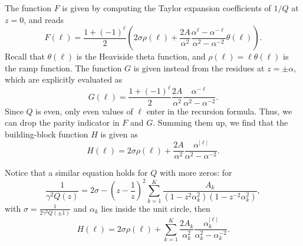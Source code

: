 \documentclass[a4paper,11pt,english]{article}
\theoremstyle{plain}
\theoremstyle{definition}
\theoremstyle{plain}
\begin{document}
The function $F$ is given by computing the Taylor expansion coefficients of $1/Q$ at $z = 0$, and reads
\begin{equation}\label{eq:F:toy} %
	F(\ell)
	=
    \frac{1 + (-1)^\ell}{2}
    \left(
	   2\sigma\rho(\ell)
	   +
	   \frac{2A}{\alpha^2}
	   \frac{\alpha^\ell - \alpha^{-\ell}}{\alpha^2 - \alpha^{-2}}
        \theta(\ell)
	\right)
	.
\end{equation}
Recall that $\theta(\ell)$ is the Heaviside theta function, and $\rho(\ell) = \ell \theta(\ell)$ is the ramp function. The function $G$ is given instead from the residues at $z = \pm \alpha$, which are explicitly evaluated as
\begin{equation}\label{eq:G:toy} %
	G(\ell)
	=
	\frac{1+(-1)^\ell}{2}
	\frac{2A}{\alpha^2}
	\frac{\alpha^{-\ell}}{\alpha^2 - \alpha^{-2}} .
\end{equation}
Since $Q$ is even, only even values of $\ell$ enter in the recursion formula. Thus, we can drop the parity indicator in $F$ and $G$. Summing them up, we find that the building-block function $H$ is given as
\begin{equation}
	H(\ell)
	=
	2\sigma\rho(\ell)
	+
	\frac{2A}{\alpha^2}
		\frac{\alpha^{|\ell|}}{\alpha^2 - \alpha^{-2}}
	.
\end{equation}

Notice that a similar equation holds for $Q$ with more zeros: for
\begin{equation}\label{eq:M:toy}
	\frac{1}{\gamma^2 Q(z)}
	=
	2\sigma
	-
	\left( z - \frac{1}{z} \right)^2
	\sum_{k=1}^K \frac{A_k}{(1-z^2\alpha_k^2)(1-z^{-2}\alpha_k^2)} ,
\end{equation}
with $\sigma = \frac{1}{2\gamma^2 Q(\pm 1)}$ and $\alpha_k$ lies inside the unit circle, then
\begin{equation}\label{eq:H:toy}
	H(\ell)
	=
	2\sigma\rho(\ell)
	+
	\sum_{k=1}^K
		\frac{2A_k}{\alpha_k^2}
			\frac{\alpha_k^{|\ell|}}{\alpha_k^2 - \alpha_k^{-2}}
	.
\end{equation}

\end{document}
